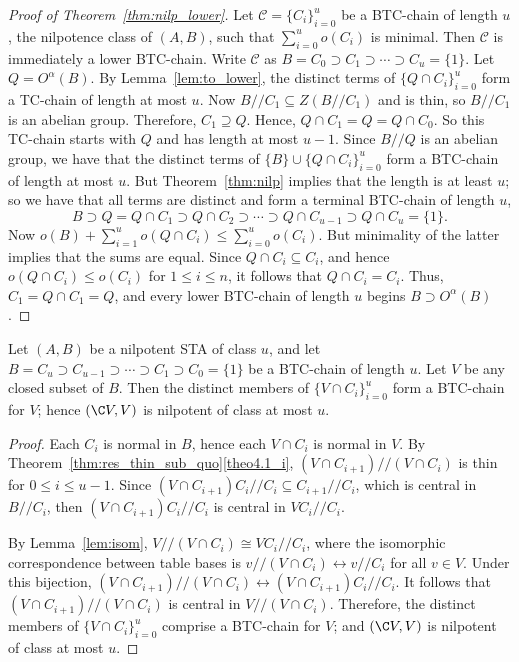\begin{proof} [Proof of Theorem~\ref{thm:nilp_lower}] 
Let $\mathcal{C} = \{C_i\}_{i=0}^u$ be a BTC-chain of length $u$, the
nilpotence class of $(A, B)$, such that $\sum_{i=0}^uo(C_i)$ is minimal.
Then $\mathcal{C}$ is immediately a lower BTC-chain. Write
$\mathcal{C}$ as $B = C_0 \supset C_1 \supset \cdots \supset C_u =
\{1\}$. Let $Q = O^{\alpha}(B)$. By Lemma~\ref{lem:to_lower}, the
distinct terms of $\{Q\cap C_i\}_{i=0}^u$ form a TC-chain of length at
most $u$. Now $B//C_1 \subseteq Z(B//C_1)$ and is thin, so $B//C_1$ is an
abelian group. Therefore, $C_1 \supseteq Q$. Hence, $Q\cap C_1 = Q =
Q\cap C_0$. So this TC-chain starts with $Q$ and has length at most
$u-1$. Since $B//Q$ is an abelian group, we have that the distinct
terms of $\{B\}\cup \{Q\cap C_i\}_{i=0}^u$ form a BTC-chain of
length at most $u$. But Theorem~\ref{thm:nilp} implies that the length
is at least $u$; so we have that all terms are distinct and form a
terminal BTC-chain of length $u$, 
\begin{equation}
\label{eq:lower}
B \supset Q = Q\cap C_1 \supset Q\cap C_2 \supset \cdots \supset Q\cap
C_{u-1} \supset Q\cap C_u = \{1\}. 
\end{equation}
Now $o(B) + \sum_{i=1}^uo(Q\cap C_i) \leq \sum_{i=0}^uo(C_i)$. But
minimality of the latter implies that the sums are equal. Since $Q\cap
C_i \subseteq C_i$, and hence $o(Q\cap C_i) \leq o(C_i)$ for $1 \leq i
\leq n$, it follows
that $Q\cap C_i = C_i$. Thus, $C_1 = Q\cap C_1 = Q$, and every lower
BTC-chain of length $u$ begins 
$B \supset O^{\alpha}(B)$. 
\end{proof}
 
 
\begin{thm}
\label{thm:closed_sub_nilp}
Let $(A, B)$ be a nilpotent STA of class $u$, and let $B = C_u \supset
C_{u-1} \supset \cdots \supset C_1 \supset C_0 = \{1\}$ be a BTC-chain
of length $u$. Let $V$ be any closed subset of $B$. Then the distinct
members of $\{V\cap C_i\}_{i=0}^u$ form a BTC-chain for $V$; hence
$({\C}V, V)$
is nilpotent of class at most $u$. 
\end{thm}

\begin{proof}
Each $C_i$ is normal in $B$, hence each $V\cap C_i$ is normal in $V$.
By Theorem~\ref{thm:res_thin_sub_quo}\ref{theo4.1_i}, $(V\cap C_{i+1})//(V\cap C_i)$
is thin for $0 \leq i \leq u-1$. Since $(V\cap C_{i+1})C_i//C_i
\subseteq C_{i+1}//C_i$, which is central in $B//C_i$, then $(V\cap
C_{i+1})C_i//C_i$ is central in $VC_i//C_i$. 

By Lemma~\ref{lem:isom}, $V//(V\cap C_i) \cong VC_i//C_i$, where the
isomorphic correspondence between table bases is $v//(V\cap C_i)
\leftrightarrow v//C_i$ for all $v \in V$. Under this bijection,
$(V\cap C_{i+1})//(V\cap C_i) \leftrightarrow (V\cap C_{i+1})C_i//C_i$.
It follows that $(V\cap C_{i+1})//(V\cap C_i)$ is central in $V//(V\cap
C_i)$. Therefore, the distinct members of $\{V\cap C_i\}_{i=0}^u$
comprise a BTC-chain for $V$; and $({\C}V, V)$ is nilpotent of class at
most $u$.
\end{proof} 

